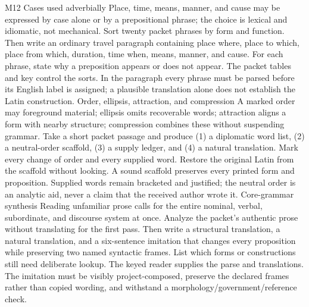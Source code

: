 \begin{courseunit}{M12}
\SubmoduleExtension
  {Cases used adverbially}
  {Place, time, means, manner, and cause may be expressed by case alone or by a
  prepositional phrase; the choice is lexical and idiomatic, not mechanical.}
  {Sort twenty packet phrases by form and function.  Then write an ordinary
  travel paragraph containing place where, place to which, place from which,
  duration, time when, means, manner, and cause.}
  {For each phrase, state why a preposition appears or does not appear.}
  {The packet tables and key control the sorts.  In the paragraph every phrase
  must be parsed before its English label is assigned; a plausible translation
  alone does not establish the Latin construction.}
\SubmoduleExtension
  {Order, ellipsis, attraction, and compression}
  {A marked order may foreground material; ellipsis omits recoverable words;
  attraction aligns a form with nearby structure; compression combines these
  without suspending grammar.}
  {Take a short packet passage and produce (1) a diplomatic word list, (2) a
  neutral-order scaffold, (3) a supply ledger, and (4) a natural translation.
  Mark every change of order and every supplied word.}
  {Restore the original Latin from the scaffold without looking.}
  {A sound scaffold preserves every printed form and proposition.  Supplied
  words remain bracketed and justified; the neutral order is an analytic aid,
  never a claim that the received author wrote it.}
\SubmoduleExtension
  {Core-grammar synthesis}
  {Reading unfamiliar prose calls for the entire nominal, verbal, subordinate,
  and discourse system at once.}
  {Analyze the packet's authentic prose without translating for the first
  pass.  Then write a structural translation, a natural translation, and a
  six-sentence imitation that changes every proposition while preserving two
  named syntactic frames.}
  {List which forms or constructions still need deliberate lookup.}
  {The keyed reader supplies the parse and translations.  The imitation must
  be visibly project-composed, preserve the declared frames rather than copied
  wording, and withstand a morphology/government/reference check.}
\end{courseunit}

